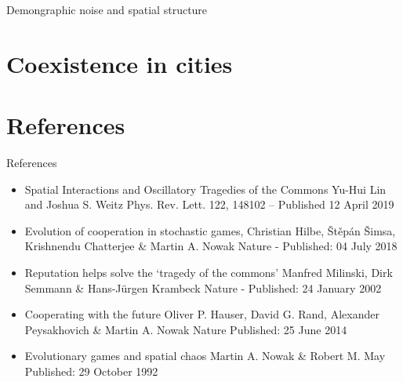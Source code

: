 \documentclass{beamer}
\begin{document}
\begin{frame}{Demongraphic noise and spatial structure}
    
\end{frame}

\section{Coexistence in cities}


\section{References}
\begin{frame}{References}
    \begin{itemize}
        \item Spatial Interactions and Oscillatory Tragedies of the Commons
        Yu-Hui Lin and Joshua S. Weitz
        Phys. Rev. Lett. 122, 148102 – Published 12 April 2019
        \item Evolution of cooperation in stochastic games, Christian Hilbe, Štěpán Šimsa, Krishnendu Chatterjee \& Martin A. Nowak 
        Nature - Published: 04 July 2018
        \item Reputation helps solve the ‘tragedy of the commons’
        Manfred Milinski, Dirk Semmann \& Hans-Jürgen Krambeck Nature - Published: 24 January 2002
        \item Cooperating with the future
        Oliver P. Hauser, David G. Rand, Alexander Peysakhovich \& Martin A. Nowak Nature Published: 25 June 2014
        \item Evolutionary games and spatial chaos
        Martin A. Nowak \& Robert M. May Published: 29 October 1992
    \end{itemize}
\end{frame}
\end{document}
